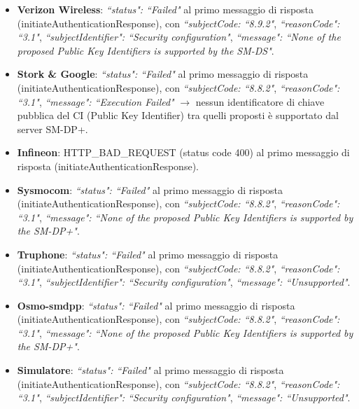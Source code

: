 \documentclass[10pt, oneside]{book}
\begin{document}
\begin{itemize}
\item \textbf{Verizon Wireless}: \textit{``status": ``Failed"} al primo messaggio di risposta (initiateAuthenticationResponse), con \textit{``subjectCode: ``8.9.2"}, \textit{``reasonCode": ``3.1"}, \textit{``subjectIdentifier": ``Security configuration"}, \textit{``message": ``None of the proposed Public Key Identifiers is supported by the SM-DS"}.
\item \textbf{Stork \& Google}: \textit{``status": ``Failed"} al primo messaggio di risposta (initiateAuthenticationResponse), con \textit{``subjectCode: ``8.8.2"}, \textit{``reasonCode": ``3.1"}, \textit{``message": ``Execution Failed"} $\rightarrow$ nessun identificatore di chiave pubblica del CI (Public Key Identifier) tra quelli proposti è supportato dal server SM-DP+.
\item \textbf{Infineon}: HTTP\_BAD\_REQUEST (status code 400) al primo messaggio di risposta (initiateAuthenticationResponse).
\item \textbf{Sysmocom}: \textit{``status": ``Failed"} al primo messaggio di risposta (initiateAuthenticationResponse), con \textit{``subjectCode: ``8.8.2"}, \textit{``reasonCode": ``3.1"}, \textit{``message": ``None of the proposed Public Key Identifiers is supported by the SM-DP+"}.
\item \textbf{Truphone}: \textit{``status": ``Failed"} al primo messaggio di risposta (initiateAuthenticationResponse), con \textit{``subjectCode: ``8.8.2"}, \textit{``reasonCode": ``3.1"}, \textit{``subjectIdentifier": ``Security configuration"}, \textit{``message": ``Unsupported"}.
\item \textbf{Osmo-smdpp}: \textit{``status": ``Failed"} al primo messaggio di risposta (initiateAuthenticationResponse), con \textit{``subjectCode: ``8.8.2"}, \textit{``reasonCode": ``3.1"}, \textit{``message": ``None of the proposed Public Key Identifiers is supported by the SM-DP+"}.
\item \textbf{Simulatore}: \textit{``status": ``Failed"} al primo messaggio di risposta (initiateAuthenticationResponse), con \textit{``subjectCode: ``8.8.2"}, \textit{``reasonCode": ``3.1"}, \textit{``subjectIdentifier": ``Security configuration"}, \textit{``message": ``Unsupported"}.
\end{itemize}
\end{document}
